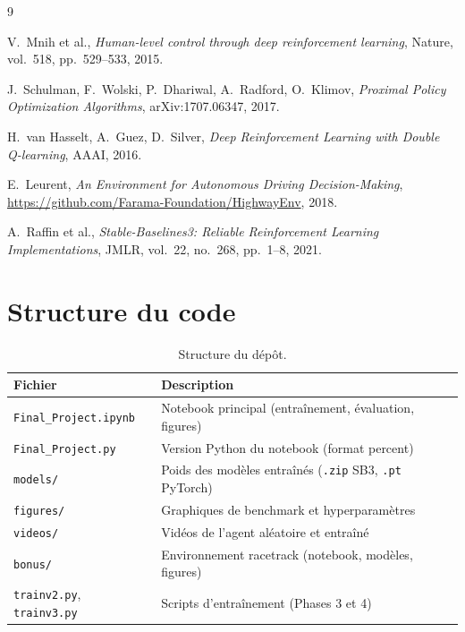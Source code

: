 \documentclass[11pt, a4paper]{article}
\begin{document}
\newpage
\begin{thebibliography}{9}

V.~Mnih et al., \emph{Human-level control through deep reinforcement learning}, Nature, vol.~518, pp.~529--533, 2015.

J.~Schulman, F.~Wolski, P.~Dhariwal, A.~Radford, O.~Klimov, \emph{Proximal Policy Optimization Algorithms}, arXiv:1707.06347, 2017.

H.~van Hasselt, A.~Guez, D.~Silver, \emph{Deep Reinforcement Learning with Double Q-learning}, AAAI, 2016.

E.~Leurent, \emph{An Environment for Autonomous Driving Decision-Making}, \url{https://github.com/Farama-Foundation/HighwayEnv}, 2018.

A.~Raffin et al., \emph{Stable-Baselines3: Reliable Reinforcement Learning Implementations}, JMLR, vol.~22, no.~268, pp.~1--8, 2021.

\end{thebibliography}

\newpage
\appendix
\section{Structure du code}

\begin{table}[H]
\centering
\begin{tabular}{lp{9cm}}
\toprule
\textbf{Fichier} & \textbf{Description}\\
\midrule
\texttt{Final\_Project.ipynb} & Notebook principal (entraînement, évaluation, figures)\\
\texttt{Final\_Project.py} & Version Python du notebook (format percent)\\
\texttt{models/} & Poids des modèles entraînés (\texttt{.zip} SB3, \texttt{.pt} PyTorch)\\
\texttt{figures/} & Graphiques de benchmark et hyperparamètres\\
\texttt{videos/} & Vidéos de l'agent aléatoire et entraîné\\
\texttt{bonus/} & Environnement racetrack (notebook, modèles, figures)\\
\texttt{trainv2.py}, \texttt{trainv3.py} & Scripts d'entraînement (Phases 3 et 4)\\
\bottomrule
\end{tabular}
\caption{Structure du dépôt.}
\end{table}
\end{document}
